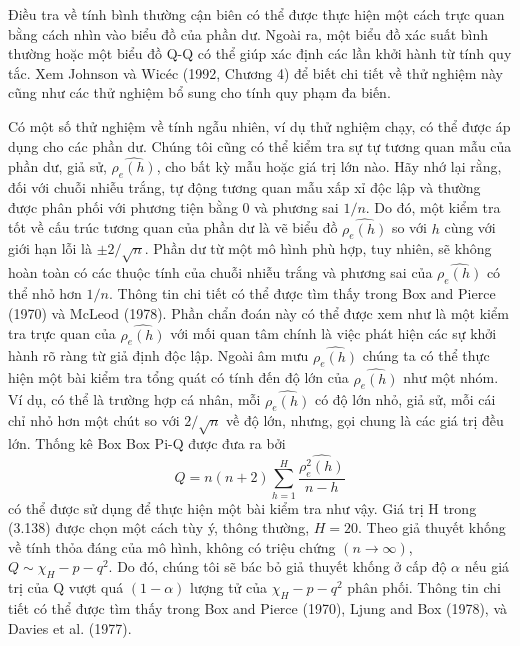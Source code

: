 \documentclass[12pt, a4paper,oneside]{book}
\theoremstyle{definition}
\begin{document}
Điều tra về tính bình thường cận biên có thể được thực hiện một cách trực quan bằng cách nhìn vào biểu đồ của phần dư. Ngoài ra, một biểu đồ xác suất bình thường hoặc một biểu đồ Q-Q có thể giúp xác định các lần khởi hành từ tính quy tắc. Xem Johnson và Wicéc (1992, Chương 4) để biết chi tiết về thử nghiệm này cũng như các thử nghiệm bổ sung cho tính quy phạm đa biến.

Có một số thử nghiệm về tính ngẫu nhiên, ví dụ thử nghiệm chạy, có thể được áp dụng cho các phần dư. Chúng tôi cũng có thể kiểm tra sự tự tương quan mẫu của phần dư, giả sử, $\hat{\rho_{e}(h)}$, cho bất kỳ mẫu hoặc giá trị lớn nào. Hãy nhớ lại rằng, đối với chuỗi nhiễu trắng, tự động tương quan mẫu xấp xỉ độc lập và thường được phân phối với phương tiện bằng $0$ và phương sai $1/n$. Do đó, một kiểm tra tốt về cấu trúc tương quan của phần dư là vẽ biểu đồ $\hat{\rho_{e}(h)}$ so với $h$ cùng với giới hạn lỗi là $\pm2/\sqrt{n}$. Phần dư từ một mô hình phù hợp, tuy nhiên, sẽ không hoàn toàn có các thuộc tính của chuỗi nhiễu trắng và phương sai của $\hat{\rho_{e}(h)}$ có thể nhỏ hơn $1/n$. Thông tin chi tiết có thể được tìm thấy trong Box and Pierce (1970) và McLeod (1978). Phần chẩn đoán này có thể được xem như là một kiểm tra trực quan của $\hat{\rho_{e}(h)}$ với mối quan tâm chính là việc phát hiện các sự khởi hành rõ ràng từ giả định độc lập. Ngoài âm mưu  $\hat{\rho_{e}(h)}$ chúng ta có thể thực hiện một bài kiểm tra tổng quát có tính đến độ lớn của $\hat{\rho_{e}(h)}$ như một nhóm. Ví dụ, có thể là trường hợp cá nhân, mỗi $\hat{\rho_{e}(h)}$ có độ lớn nhỏ, giả sử, mỗi cái chỉ nhỏ hơn một chút so với $2/\sqrt{n}$ về độ lớn, nhưng, gọi chung là các giá trị đều lớn. Thống kê Box Box Pi-Q được đưa ra bởi
$$Q = n(n+2)\displaystyle\sum_{h=1}^{H}\dfrac{\hat{\rho_{e}^{2}(h)}}{n-h}$$
có thể được sử dụng để thực hiện một bài kiểm tra như vậy. Giá trị H trong (3.138) được chọn một cách tùy ý, thông thường, $H = 20$. Theo giả thuyết khống về tính thỏa đáng của mô hình, không có triệu chứng $(n\rightarrow \infty)$, $Q\sim \chi_H-p-q^{2}$. Do đó, chúng tôi sẽ bác bỏ giả thuyết khống ở cấp độ $\alpha$ nếu giá trị của Q vượt quá $(1-\alpha)$ lượng tử của $\chi_H-p-q^{2}$ phân phối. Thông tin chi tiết có thể được tìm thấy trong Box and Pierce (1970), Ljung and Box (1978), và Davies et al. (1977).
\end{document}
